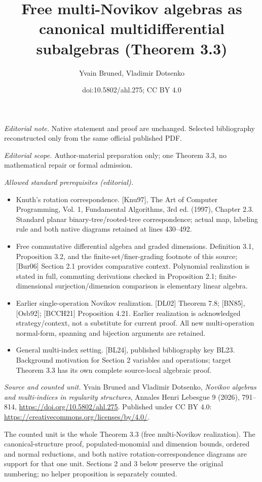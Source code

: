 \documentclass[10pt,a4paper]{article}
\title{Free multi-Novikov algebras as canonical multidifferential subalgebras (Theorem 3.3)}
\author{Yvain Bruned, Vladimir Dotsenko}
\date{doi:10.5802/ahl.275; CC BY 4.0}
\theoremstyle{definition}
\numberwithin{equation}{section}
\numberwithin{figure}{section}
\begin{document}
\maketitle
\noindent\textit{Editorial note.} Native statement and proof are unchanged. Selected bibliography reconstructed only from the same official published PDF.\par\medskip
\noindent\textit{Editorial scope.} Author-material preparation only; one Theorem 3.3, no mathematical repair or formal admission.\par\medskip
\noindent\textit{Allowed standard prerequisites (editorial).}\begin{itemize}
\item Knuth's rotation correspondence. [Knu97], The Art of Computer Programming, Vol. 1, Fundamental Algorithms, 3rd ed. (1997), Chapter 2.3. Standard planar binary-tree/rooted-tree correspondence; actual map, labeling rule and both native diagrams retained at lines 430–492.
\item Free commutative differential algebra and graded dimensions. Definition 3.1, Proposition 3.2, and the finite-set/finer-grading footnote of this source; [Bur06] Section 2.1 provides comparative context. Polynomial realization is stated in full, commuting derivations checked in Proposition 2.1; finite-dimensional surjection/dimension comparison is elementary linear algebra.
\item Earlier single-operation Novikov realization. [DL02] Theorem 7.8; [BN85], [Osb92]; [BCCH21] Proposition 4.21. Earlier realization is acknowledged strategy/context, not a substitute for current proof. All new multi-operation normal-form, spanning and bijection arguments are retained.
\item General multi-index setting. [BL24], published bibliography key BL23. Background motivation for Section 2 variables and operations; target Theorem 3.3 has its own complete source-local algebraic proof.
\end{itemize}\medskip
\noindent\textit{Source and counted unit.} Yvain Bruned and Vladimir Dotsenko, \emph{Novikov algebras and multi-indices in regularity structures}, Annales Henri Lebesgue 9 (2026), 791--814, \url{https://doi.org/10.5802/ahl.275}. Published under CC BY 4.0: \url{https://creativecommons.org/licenses/by/4.0/}.
\par\noindent The counted unit is the whole Theorem 3.3 (free multi-Novikov realization). The canonical-structure proof, populated-monomial and dimension bounds, ordered and normal reductions, and both native rotation-correspondence diagrams are support for that one unit. Sections 2 and 3 below preserve the original numbering; no helper proposition is separately counted.
\end{document}
